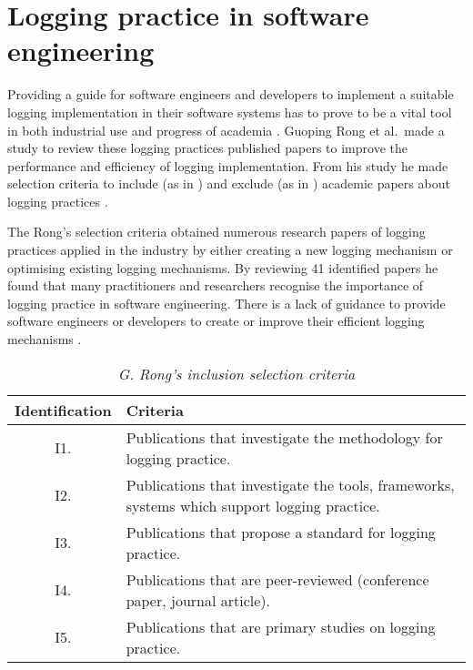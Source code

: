 \cleardoublepage
\appendix

\chapter{Logging practice in software engineering}\label{apx:loggingPractice}
Providing a guide for software engineers and developers to implement a suitable logging implementation in their software systems has to prove to be a vital tool in both industrial use and progress of academia \cite{Rong2018a}. Guoping Rong et al.~made a study to review these logging practices published papers to improve the performance and efficiency of logging implementation. From his study he made selection criteria to include (as in ) and exclude (as in ) academic papers about logging practices \cite{Rong2018a,Rong2018}.\par The Rong's selection criteria obtained numerous research papers of logging practices applied in the industry by either creating a new logging mechanism or optimising existing logging mechanisms. By reviewing 41 identified papers he found that many practitioners and researchers recognise the importance of logging practice in software engineering. There is a lack of guidance to provide software engineers or developers to create or improve their efficient logging mechanisms \cite{Rong2018a,Zhu2015}. 

\begin{table}[!htb]
	\centering
	\caption[G. Rong's inclusion selection criteria]
	{\textit{G. Rong's inclusion selection criteria \cite{Rong2018a}}}
	\label{tbl:CH1_RongIncSelectionCriteria}
	\begin{tabularx}{\textwidth}{|c|X|}
		\hline \textbf{Identification} & \textbf{Criteria} \\
		\hline I1. & Publications that investigate the methodology for logging practice. \\
		\hline I2. & Publications that investigate the tools, frameworks, systems which support logging practice. \\
		\hline I3. & Publications that propose a standard for logging practice.\\
		\hline I4. & Publications that are peer-reviewed (conference paper, journal article). \\
		\hline I5. & Publications that are primary studies on logging practice. \\
		\hline
	\end{tabularx}
\end{table}

